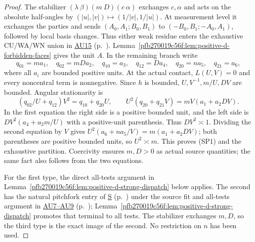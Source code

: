 \begin{proof}
The stabilizer $(\lambda\ \beta)(m\ D)(c\ \alpha)$ exchanges
$c,\alpha$ and acts on the absolute half-angles by
$(|u|,|v|)\mapsto(1/|v|,1/|u|)$. At measurement level it exchanges
the parties and sends $(A_0,A_1;B_0,B_1)$ to
$(-B_0,B_1;-A_0,A_1)$, followed by local basis changes.
Thus either weak residue enters
the exhaustive CU/WA/WN union in \hyperref[component:pc0b2849f8d09]{AU15} (p.~\pageref{component:pc0b2849f8d09}). Lemma~\ref{pfb270019c56f:lem:positive-d-forbidden-faces}
gives the unit $A$. In the remaining branch write
\[
 q_{01}=ma_1,\quad q_{02}=mDa_2,\quad q_{10}=a_3,
 \quad q_{12}=Da_4,\quad q_{20}=na_5,\quad q_{21}=a_6,
\]
where all $a_i$ are bounded positive units. At the actual contact,
$L(U,V)=0$ and every noncentral term is nonnegative. Since $h$ is
bounded, $U,V^{-1},m/U,DV$ are bounded. Angular stationarity is
\[
 (q_{02}/U+q_{12})V^2=q_{10}+q_{20}U,
 \qquad U^2(q_{20}+q_{21}V)=mV(a_1+a_2DV).
\]
In the first equation the right side is a positive bounded unit,
and the left side is $DV^2(a_4+a_2m/U)$ with a positive-unit
parenthesis. Thus $DV^2\asymp1$. Dividing the second equation by
$V$ gives $U^2(a_6+na_5/V)=m(a_1+a_2DV)$; both parentheses
are positive bounded units, so $U^2\asymp m$. This proves (SP1)
and the exhaustive partition. Coercivity ensures $m,D>0$ as actual
source quantities; the same fact also follows from the two equations.

For the first type, the direct all-tests argument in
Lemma~\ref{pfb270019c56f:lem:positive-d-strong-dispatch} below applies. The second
has the natural pitchfork entry of \hyperref[component:pfb0cf454f653]{S} (p.~\pageref{component:pfb0cf454f653}) under the source fit and all-tests argument in \hyperref[component:pc0b2849f8d09]{AU7--AU9} (p.~\pageref{component:pc0b2849f8d09});
Lemma~\ref{pfb270019c56f:lem:positive-d-strong-dispatch} promotes that terminal
to all tests. The stabilizer exchanges $m,D$, so the third type is
the exact image of the second. No restriction on $n$ has been used.
\end{proof}

